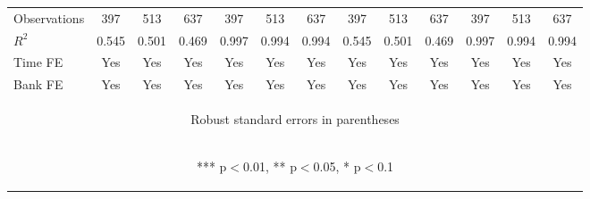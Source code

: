 \documentclass[]{article}
\begin{document}
\begin{center}
\begin{tabular}{lcccccccccccc}
Observations & 397 & 513 & 637 & 397 & 513 & 637 & 397 & 513 & 637 & 397 & 513 & 637 \\
$R^2$ & 0.545 & 0.501 & 0.469 & 0.997 & 0.994 & 0.994 & 0.545 & 0.501 & 0.469 & 0.997 & 0.994 & 0.994 \\
Time FE & Yes & Yes & Yes & Yes & Yes & Yes & Yes & Yes & Yes & Yes & Yes & Yes \\
 Bank FE & Yes & Yes & Yes & Yes & Yes & Yes & Yes & Yes & Yes & Yes & Yes & Yes \\ \hline
\multicolumn{13}{c}{\begin{footnotesize} Robust standard errors in parentheses\end{footnotesize}} \\
\multicolumn{13}{c}{\begin{footnotesize} *** p$<$0.01, ** p$<$0.05, * p$<$0.1\end{footnotesize}} \\
\end{tabular}
\end{center}
\end{document}

